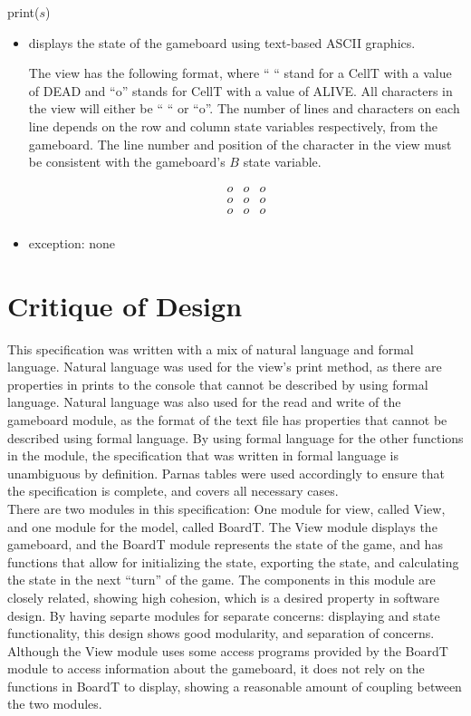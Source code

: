 \documentclass[12pt]{article}
\begin{document}
\noindent print($s$)
\begin{itemize}
\item displays the state of the gameboard using text-based ASCII graphics. 

The view has the following format, where `` `` stand for a CellT with a value of DEAD  and ``o'' stands for CellT with a value of ALIVE. All characters in the view will either be `` `` or  ``o''. The number of lines and characters on each line depends on the row and column state variables respectively, from the gameboard. The line number and position of the character in the view must be consistent with the gameboard's $B$ state variable. 

  \begin{equation}
    \begin{array}{ccc}
      o & o & o   \\
      o & o & o   \\
      o & o & o  \\

    \end{array}
  \end{equation}

\item exception: none
\end{itemize}

\newpage

\section*{Critique of Design}

This specification was written with a mix of natural language and formal language. Natural language was used for the view's print method, as there are properties in prints to the console that cannot be described by using formal language. Natural language was also used for the read and write of the gameboard module, as the format of the text file has properties that cannot be described using formal language. By using formal language for the other functions in the module, the specification that was written in formal language is unambiguous by definition. Parnas tables were used accordingly to ensure that the specification is complete, and covers all necessary cases.\\

There are two modules in this specification: One module for view, called View, and one module for the model, called BoardT. The View module displays the gameboard, and the BoardT module represents the state of the game, and has functions that allow for initializing the state, exporting the state, and calculating the state in the next  ``turn'' of the game. The components in this module are closely related, showing high cohesion, which is a desired property in software design. By having separte modules for  separate concerns: displaying and state functionality, this design shows good modularity, and separation of concerns. Although the View module uses some access programs provided by the BoardT module to access information about the gameboard, it does not rely on the functions in BoardT to display, showing a reasonable amount of coupling between the two modules.\\
\end{document}
